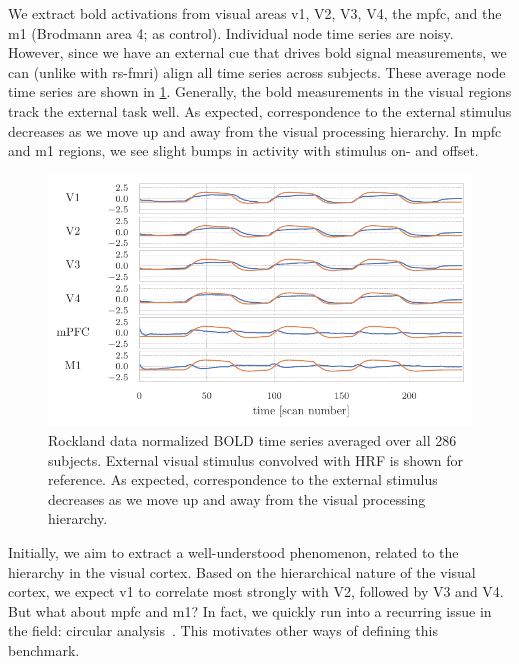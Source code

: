 We extract \gls{bold} activations from visual areas \gls{v1}, V2, V3, V4, the \gls{mpfc}, and the \gls{m1} (Brodmann area 4; as control).
%
Individual node time series are noisy.
However, since we have an external cue that drives \gls{bold} signal measurements, we can (unlike with \gls{rs-fmri}) align all time series across subjects.
These average node time series are shown in \cref{fig:rockland-time-series-mean-over-subjects}.
Generally, the \gls{bold} measurements in the visual regions track the external task well.
As expected, correspondence to the external stimulus decreases as we move up and away from the visual processing hierarchy.
In \gls{mpfc} and \gls{m1} regions, we see slight bumps in activity with stimulus on- and offset.


\begin{figure}[t]
  \centering
  \includegraphics[width=\textwidth]{fig/rockland/CHECKERBOARD645/node_timeseries/mean_over_subjects}
  \caption{
    Rockland data normalized BOLD time series averaged over all 286 subjects.
    External visual stimulus convolved with HRF is shown for reference.
    As expected, correspondence to the external stimulus decreases as we move up and away from the visual processing hierarchy.
}\label{fig:rockland-time-series-mean-over-subjects}
\end{figure}


Initially, we aim to extract a well-understood phenomenon, related to the hierarchy in the visual cortex.
Based on the hierarchical nature of the visual cortex, we expect \gls{v1} to correlate most strongly with V2, followed by V3 and V4.
But what about \gls{mpfc} and \gls{m1}?
In fact, we quickly run into a recurring issue in the field: circular analysis~\parencite{Kerr1998, Kriegeskorte2009, Kriegeskorte2010, Poldrack2012, Poldrack2017}.
This motivates other ways of defining this benchmark.

